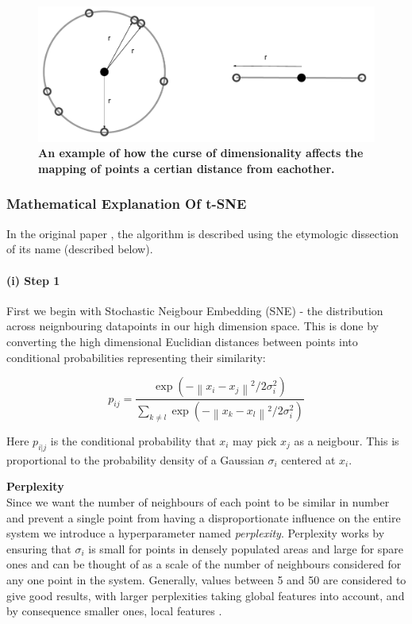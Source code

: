 \begin{figure}[H]
  \centering
\includegraphics[width=.5\textwidth]{4fig/dimcurse.pdf}
\caption{\textbf{An example of how the curse of dimensionality affects the mapping of points a certian distance from eachother.} }\label{fig:dimcurse}
\end{figure}




\subsubsection{Mathematical Explanation Of t-SNE}\label{sec:mathtsne}

%

In the original paper \citep{tsne}, the algorithm is described using the etymologic dissection of its name (described below).

\paragraph{(i) Step 1}
First we begin with Stochastic Neigbour Embedding (SNE) - the distribution across neignbouring datapoints in our high dimension space. This is done by converting the high dimensional Euclidian distances between points into conditional probabilities representing their similarity:

\begin{equation}
p_{ij} = \frac{\exp(-\left \| x_i - x_j \right \|^2 / 2\sigma_i^2)}{\sum_{k \neq l} \exp(- \left \| x_k - x_l \right \|^2 / 2\sigma_i^2)}
\end{equation}

Here $p_{i|j}$ is the conditional probability that $x_i$ may pick $x_j$ as a neigbour. This is proportional to the probability density of a Gaussian $\sigma_i$ centered at $x_i$.

\textbf{Perplexity}\\
Since we want the number of neighbours of each point to be similar in number and prevent a single point from having a disproportionate influence on the entire system we introduce a hyperparameter named \emph{perplexity}. Perplexity works by ensuring that $\sigma_i$ is small for points in densely populated areas and large for spare ones and can be thought of as a scale of the number of neighbours considered for any one point in the system. Generally, values between 5 and 50 are considered to give good results, with larger perplexities taking global features into account, and by consequence smaller ones, local features \citep{tsne}.

